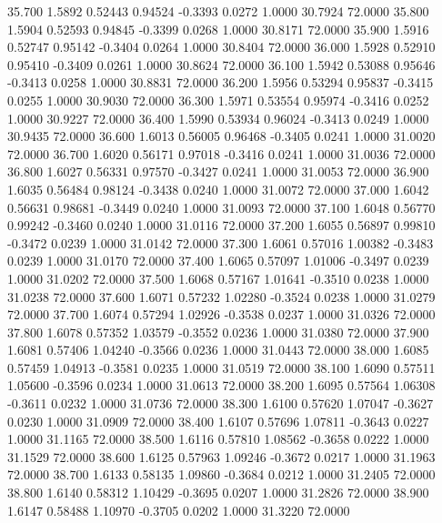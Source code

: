   35.700   1.5892   0.52443   0.94524  -0.3393   0.0272   1.0000  30.7924  72.0000
  35.800   1.5904   0.52593   0.94845  -0.3399   0.0268   1.0000  30.8171  72.0000
  35.900   1.5916   0.52747   0.95142  -0.3404   0.0264   1.0000  30.8404  72.0000
  36.000   1.5928   0.52910   0.95410  -0.3409   0.0261   1.0000  30.8624  72.0000
  36.100   1.5942   0.53088   0.95646  -0.3413   0.0258   1.0000  30.8831  72.0000
  36.200   1.5956   0.53294   0.95837  -0.3415   0.0255   1.0000  30.9030  72.0000
  36.300   1.5971   0.53554   0.95974  -0.3416   0.0252   1.0000  30.9227  72.0000
  36.400   1.5990   0.53934   0.96024  -0.3413   0.0249   1.0000  30.9435  72.0000
  36.600   1.6013   0.56005   0.96468  -0.3405   0.0241   1.0000  31.0020  72.0000
  36.700   1.6020   0.56171   0.97018  -0.3416   0.0241   1.0000  31.0036  72.0000
  36.800   1.6027   0.56331   0.97570  -0.3427   0.0241   1.0000  31.0053  72.0000
  36.900   1.6035   0.56484   0.98124  -0.3438   0.0240   1.0000  31.0072  72.0000
  37.000   1.6042   0.56631   0.98681  -0.3449   0.0240   1.0000  31.0093  72.0000
  37.100   1.6048   0.56770   0.99242  -0.3460   0.0240   1.0000  31.0116  72.0000
  37.200   1.6055   0.56897   0.99810  -0.3472   0.0239   1.0000  31.0142  72.0000
  37.300   1.6061   0.57016   1.00382  -0.3483   0.0239   1.0000  31.0170  72.0000
  37.400   1.6065   0.57097   1.01006  -0.3497   0.0239   1.0000  31.0202  72.0000
  37.500   1.6068   0.57167   1.01641  -0.3510   0.0238   1.0000  31.0238  72.0000
  37.600   1.6071   0.57232   1.02280  -0.3524   0.0238   1.0000  31.0279  72.0000
  37.700   1.6074   0.57294   1.02926  -0.3538   0.0237   1.0000  31.0326  72.0000
  37.800   1.6078   0.57352   1.03579  -0.3552   0.0236   1.0000  31.0380  72.0000
  37.900   1.6081   0.57406   1.04240  -0.3566   0.0236   1.0000  31.0443  72.0000
  38.000   1.6085   0.57459   1.04913  -0.3581   0.0235   1.0000  31.0519  72.0000
  38.100   1.6090   0.57511   1.05600  -0.3596   0.0234   1.0000  31.0613  72.0000
  38.200   1.6095   0.57564   1.06308  -0.3611   0.0232   1.0000  31.0736  72.0000
  38.300   1.6100   0.57620   1.07047  -0.3627   0.0230   1.0000  31.0909  72.0000
  38.400   1.6107   0.57696   1.07811  -0.3643   0.0227   1.0000  31.1165  72.0000
  38.500   1.6116   0.57810   1.08562  -0.3658   0.0222   1.0000  31.1529  72.0000
  38.600   1.6125   0.57963   1.09246  -0.3672   0.0217   1.0000  31.1963  72.0000
  38.700   1.6133   0.58135   1.09860  -0.3684   0.0212   1.0000  31.2405  72.0000
  38.800   1.6140   0.58312   1.10429  -0.3695   0.0207   1.0000  31.2826  72.0000
  38.900   1.6147   0.58488   1.10970  -0.3705   0.0202   1.0000  31.3220  72.0000
